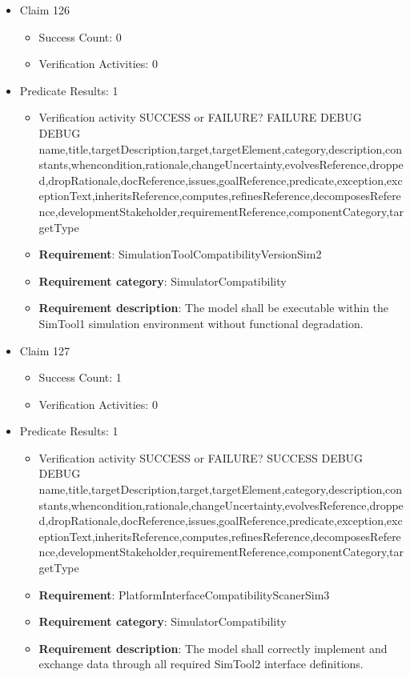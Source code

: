 \documentclass{article}
\begin{document}
\begin{itemize}
  				  \item Claim 126
				\begin{itemize}
			    	\item Success Count: 0 
			    	\item Verification Activities: 0
				\end{itemize}
				
									    
				\item Predicate Results: 1
					\begin{itemize}				
					\item Verification activity SUCCESS or FAILURE? FAILURE
					DEBUG DEBUG name,title,targetDescription,target,targetElement,category,description,constants,whencondition,rationale,changeUncertainty,evolvesReference,dropped,dropRationale,docReference,issues,goalReference,predicate,exception,exceptionText,inheritsReference,computes,refinesReference,decomposesReference,developmentStakeholder,requirementReference,componentCategory,targetType
					\item \textbf{Requirement}: SimulationToolCompatibilityVersionSim2 
					\item \textbf{Requirement category}: SimulatorCompatibility
					\item \textbf{Requirement description}: The model shall be executable within the SimTool1 simulation environment without functional degradation.
					\end{itemize}

  				  \item Claim 127
				\begin{itemize}
			    	\item Success Count: 1 
			    	\item Verification Activities: 0
				\end{itemize}
				
									    
				\item Predicate Results: 1
					\begin{itemize}				
					\item Verification activity SUCCESS or FAILURE? SUCCESS
					DEBUG DEBUG name,title,targetDescription,target,targetElement,category,description,constants,whencondition,rationale,changeUncertainty,evolvesReference,dropped,dropRationale,docReference,issues,goalReference,predicate,exception,exceptionText,inheritsReference,computes,refinesReference,decomposesReference,developmentStakeholder,requirementReference,componentCategory,targetType
					\item \textbf{Requirement}: PlatformInterfaceCompatibilityScanerSim3 
					\item \textbf{Requirement category}: SimulatorCompatibility
					\item \textbf{Requirement description}: The model shall correctly implement and exchange data through all required SimTool2 interface definitions.
					\end{itemize}


\end{itemize}
\end{document}
